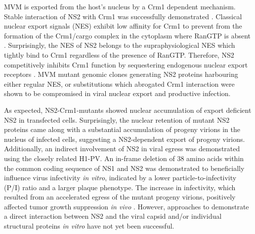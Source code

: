 MVM is exported from the host’s nucleus by a Crm1 dependent mechanism. Stable interaction of NS2 with Crm1 was successfully demonstrated \cite{pmid10438867, pmid10527855}. Classical nuclear export signals (NES) exhibit low affinity for Crm1 to prevent from the formation of the Crm1/cargo complex in the cytoplasm where RanGTP is absent \cite{pmid10449743}. Surprisingly, the NES of NS2 belongs to the supraphysiological NES which tightly bind to Crm1 regardless of the presence of RanGTP. Therefore, NS2 competitively inhibits Crm1 function by sequestering endogenous nuclear export receptors \cite{pmid18385513}. MVM mutant genomic clones generating NS2 proteins harbouring either regular NES, or substitutions which abrogated Crm1 interaction were shown to be compromised in viral nuclear export and productive infection. 

As expected, NS2-Crm1-mutants showed nuclear accumulation of export deficient NS2 in transfected cells. Surprisingly, the nuclear retention of mutant NS2 proteins came along with a substantial accumulation of progeny virions in the nucleus of infected cells, suggesting a NS2-dependent export of progeny virions. Additionally, an indirect involvement of NS2 in viral egress was demonstrated using the closely related H1-PV. An in-frame deletion of 38 amino acids within the common coding sequence of NS1 and NS2 was demonstrated to beneficially influence virus infectivity \textit{in vitro}, indicated by a lower particle-to-infectivity (P/I) ratio and a larger plaque phenotype. The increase in infectivity, which resulted from an accelerated egress of the mutant progeny virions, positively affected tumor growth suppression \textit{in vivo} \cite{pmid22553326}. However, approaches to demonstrate a direct interaction between NS2 and the viral capsid and/or individual structural proteins \textit{in vitro} have not yet been successful.  


